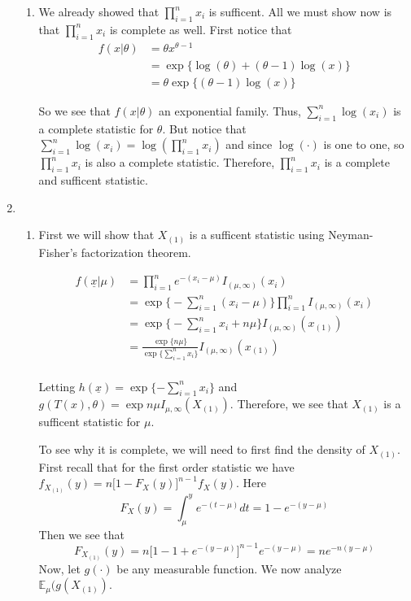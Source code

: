 \documentclass[12pt]{article}  %
\newcommand{\E}{{\mathbb{E}}}
\begin{document}
\begin{enumerate}
\begin{enumerate}
\item We already showed that $\prod_{i=1}^{n}x_i$ is sufficent. All we must show now is that $\prod_{i=1}^{n}x_i$ is complete as well. First notice that 
\begin{align*}
f(x|\theta) &= \theta x^{\theta - 1}\\
&= \exp\big\{\log(\theta) + (\theta - 1)\log(x)\big\}\\
&= \theta\exp\big\{(\theta - 1)\log(x)\big\}
\end{align*}

So we see that $f(x|\theta)$ an exponential family. Thus, $\sum_{i=1}^{n}\log(x_i)$ is a complete statistic for $\theta$. But notice that $\sum_{i=1}^{n}\log(x_i) = \log\left(\prod_{i=1}^n x_i\right)$ and since $\log(\cdot)$ is one to one, so $\prod_{i=1}^{n}x_i$ is also a complete statistic. Therefore, $\prod_{i=1}^{n}x_i$ is a complete and sufficent statistic. 

\end{enumerate}

\item 
\begin{enumerate}
\item First we will show that $X_{(1)}$ is a sufficent statistic using Neyman-Fisher's factorization theorem. 

\begin{align*}
f(\underline{x}|\mu) &= \prod_{i=1}^n e^{-(x_i-\mu)}I_{(\mu, \infty)}(x_i)\\
&= \exp\big\{-\sum_{i=1}^{n}(x_i -\mu)\big\}\prod_{i=1}^{n}I_{(\mu, \infty)}(x_i)\\
&= \exp\big\{-\sum_{i=1}^{n}x_i +n\mu\big\}I_{(\mu, \infty)}(x_{(1)})\\
&= \frac{\exp\{n\mu\}}{\exp\{\sum_{i=1}^{n}x_i\}}I_{(\mu, \infty)}(x_{(1)})\\
\end{align*}

Letting $h(\underline{x}) = \exp\{-\sum_{i=1}^n x_i\}$ and $g(T(x),\theta) = \exp{n\mu}I_{\mu, \infty}(X_{(1)})$. Therefore, we see that $X_{(1)}$ is a sufficent statistic for $\mu$. 

To see why it is complete, we will need to first find the density of $X_{(1)}$. First recall that for the first order statistic we have $f_{X_{(1)}}(y) =n\big[1-F_X(y)\big]^{n-1}f_X(y)$. Here $$F_X(y) = \int_{\mu}^{y}e^{-(t-\mu)}dt = 1-e^{-(y-\mu)}$$ Then we see that $$F_{X_{(1)}}(y) = n\big[1 - 1+ e^{-(y-\mu)}\big]^{n-1}e^{-(y-\mu)} = ne^{-n(y-\mu)}$$ Now, let $g(\cdot)$ be any measurable function. We now analyze $\E_{\mu}(g(X_{(1)})$. 


\end{enumerate}
\end{enumerate}
\end{document}
